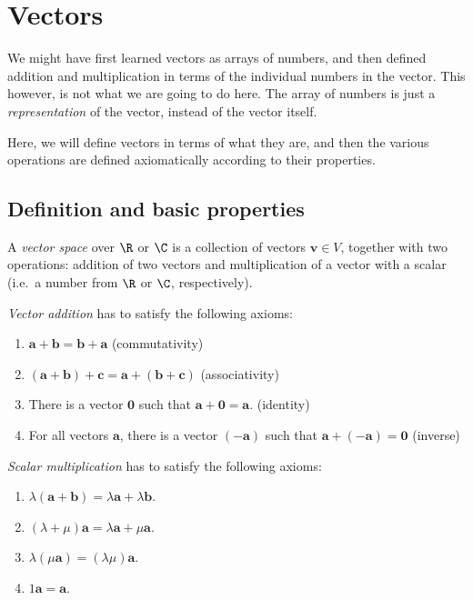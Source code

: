 \documentclass[a4paper]{article}
\begin{document}
\section{Vectors}
We might have first learned vectors as arrays of numbers, and then defined addition and multiplication in terms of the individual numbers in the vector. This however, is not what we are going to do here. The array of numbers is just a \emph{representation} of the vector, instead of the vector itself.

Here, we will define vectors in terms of what they are, and then the various operations are defined axiomatically according to their properties.
\subsection{Definition and basic properties}
\begin{defi}[Vector]
  A \emph{vector space} over $\R$ or $\C$ is a collection of vectors $\mathbf{v}\in V$, together with two operations: addition of two vectors and multiplication of a vector with a scalar (i.e.\ a number from $\R$ or $\C$, respectively).

  \emph{Vector addition} has to satisfy the following axioms:
  \begin{enumerate}
    \item $\mathbf{a} + \mathbf{b} = \mathbf{b} + \mathbf{a}$ \hfill (commutativity)
    \item $(\mathbf{a} + \mathbf{b}) + \mathbf{c} = \mathbf{a} + (\mathbf{b} + \mathbf{c})$ \hfill (associativity)
    \item There is a vector $\mathbf{0}$ such that $\mathbf{a} + \mathbf{0} = \mathbf{a}$. \hfill (identity)
    \item For all vectors $\mathbf{a}$, there is a vector $(-\mathbf{a})$ such that $\mathbf{a} + (-\mathbf{a}) = \mathbf{0}$ \hfill (inverse)
  \end{enumerate}
  \emph{Scalar multiplication} has to satisfy the following axioms:
  \begin{enumerate}
    \item $\lambda(\mathbf{a + b}) = \lambda\mathbf{a} + \lambda\mathbf{b}$.
    \item $(\lambda + \mu)\mathbf{a} = \lambda\mathbf{a} + \mu\mathbf{a}$.
    \item $\lambda(\mu\mathbf{a}) = (\lambda\mu)\mathbf{a}$.
    \item $1\mathbf{a = a}$.
  \end{enumerate}
\end{defi}
\end{document}

